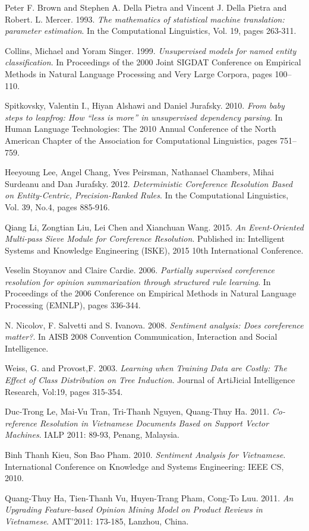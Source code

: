 \documentclass[12pt]{report}
\begin{document}
\begin{thebibliography}{30}
	Peter F. Brown and Stephen A. Della Pietra and Vincent J. Della Pietra and Robert. L. Mercer. 1993.
	\textit{The mathematics of statistical machine translation: parameter estimation}.
	In the Computational Linguistics,  Vol. 19, pages 263-311.

	Collins, Michael and Yoram Singer. 1999.
	\textit{Unsupervised models for named entity classification}.
	In Proceedings of the 2000 Joint SIGDAT Conference on Empirical Methods in Natural Language Processing and Very Large Corpora, pages 100–110.

	Spitkovsky, Valentin I., Hiyan Alshawi and Daniel Jurafsky. 2010.
	\textit{From baby steps to leapfrog: How “less is more” in unsupervised dependency parsing}.
	In Human Language Technologies: The 2010 Annual Conference of the North American Chapter of the Association for Computational Linguistics, pages 751–759.

	Heeyoung Lee, Angel Chang, Yves Peirsman, Nathanael Chambers, Mihai Surdeanu and Dan Jurafsky. 2012.
	\textit{Deterministic Coreference Resolution Based on Entity-Centric, Precision-Ranked Rules}.
	In the Computational Linguistics,  Vol. 39, No.4, pages 885-916.

	Qiang Li, Zongtian Liu, Lei Chen and Xianchuan Wang. 2015.
	\textit{An Event-Oriented Multi-pass Sieve Module for Coreference Resolution}.
	Published in: Intelligent Systems and Knowledge Engineering (ISKE), 2015 10th International Conference.

	Veselin Stoyanov and Claire Cardie. 2006.
	\textit{Partially supervised coreference resolution for opinion summarization through structured rule learning}.
	In Proceedings of the 2006 Conference on Empirical Methods in Natural Language
	Processing (EMNLP), pages 336-344.

	N. Nicolov, F. Salvetti and S. Ivanova. 2008.
	\textit{Sentiment analysis: Does coreference matter?}.
	In AISB 2008 Convention Communication, Interaction and Social Intelligence.	

	Weiss, G. and Provost,F. 2003.
	\textit{Learning when Training Data are Costly: The Effect of Class Distribution on Tree Induction}.
	Journal of ArtiJicial Intelligence Research, Vol:19, pages 315-354.

	Duc-Trong Le, Mai-Vu Tran, Tri-Thanh Nguyen, Quang-Thuy Ha. 2011.
	\textit{Co-reference Resolution in Vietnamese Documents Based on Support Vector Machines}.
	IALP 2011: 89-93, Penang, Malaysia.

	Binh Thanh Kieu, Son Bao Pham. 2010.
	\textit{Sentiment Analysis for Vietnamese}.
	International Conference on Knowledge and Systems Engineering: IEEE CS, 2010.

	Quang-Thuy Ha, Tien-Thanh Vu, Huyen-Trang Pham, Cong-To Luu. 2011.
	\textit{An Upgrading Feature-based Opinion Mining Model on Product Reviews in Vietnamese}.
	AMT’2011: 173-185, Lanzhou, China.

 
\end{thebibliography}	
\end{document}
